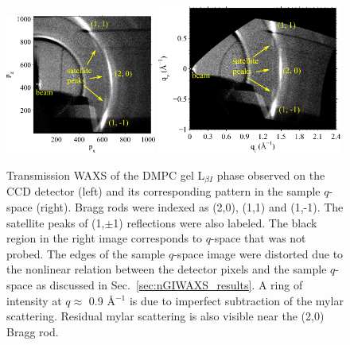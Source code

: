 \begin{figure}[htbp]
  \centering
  \includegraphics[width=0.44\textwidth]{figures/ripple/tWAXS/twaxs_gel_ccd}
  \includegraphics[width=0.54\textwidth]{figures/ripple/tWAXS/twaxs_gel_q}
  \caption[Transmission WAXS of the DMPC gel phase]
  {Transmission WAXS of the DMPC gel L$_{\beta I}$ phase observed on
  the CCD detector (left) and its corresponding pattern in the sample $q$-space
  (right). Bragg rods were indexed as (2,0), (1,1) and (1,-1). The satellite 
  peaks of (1,$\pm$1) reflections were also labeled. The black region in
  the right image corresponds to $q$-space that was not probed. The edges
  of the sample $q$-space image were distorted due to the nonlinear relation
  between the detector pixels and the sample $q$-space as discussed in 
  Sec.~\ref{sec:nGIWAXS_results}. A ring of intensity
  at $q \approx$ 0.9 \AA$^{-1}$ is due to imperfect subtraction of the mylar
  scattering. Residual mylar scattering is also visible near the (2,0) Bragg 
  rod.}
  \label{fig:twaxs_gel}
\end{figure}

